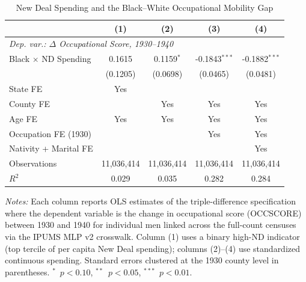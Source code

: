 \begin{table}[t]
\centering
\caption{New Deal Spending and the Black--White Occupational Mobility Gap}
\label{tab:main}
\begin{tabular}{lcccc}
\toprule
 & (1) & (2) & (3) & (4) \\
\midrule
\multicolumn{5}{l}{\textit{Dep. var.: $\Delta$ Occupational Score, 1930--1940}} \\[6pt]
Black $\times$ ND Spending & 0.1615 & 0.1159$^{*}$ & -0.1843$^{***}$ & -0.1882$^{***}$ \\
 & (0.1205) & (0.0698) & (0.0465) & (0.0481) \\[6pt]
State FE & Yes & & & \\
County FE & & Yes & Yes & Yes \\
Age FE & Yes & Yes & Yes & Yes \\
Occupation FE (1930) & & & Yes & Yes \\
Nativity + Marital FE & & & & Yes \\
Observations & 11,036,414 & 11,036,414 & 11,036,414 & 11,036,414 \\
$R^2$ & 0.029 & 0.035 & 0.282 & 0.284 \\
\bottomrule
\end{tabular}
\begin{tablenotes}
\item \textit{Notes:} Each column reports OLS estimates of the triple-difference specification where the dependent variable is the change in occupational score (OCCSCORE) between 1930 and 1940 for individual men linked across the full-count censuses via the IPUMS MLP v2 crosswalk. Column (1) uses a binary high-ND indicator (top tercile of per capita New Deal spending); columns (2)--(4) use standardized continuous spending. Standard errors clustered at the 1930 county level in parentheses. $^{*}$~$p<0.10$, $^{**}$~$p<0.05$, $^{***}$~$p<0.01$.
\end{tablenotes}
\end{table}
